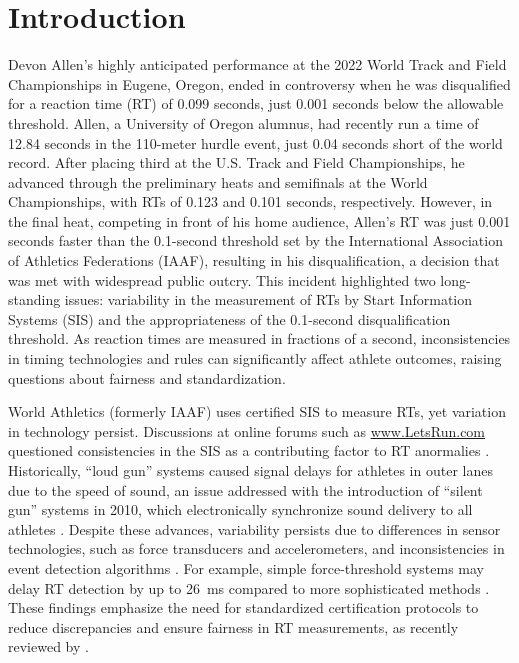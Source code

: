 \documentclass[12pt, letterpaper]{article}
\begin{document}
\doublespace


\section{Introduction}
\label{sec:intro}

Devon Allen’s highly anticipated performance at the 2022 World
Track and Field Championships in Eugene, Oregon, ended in
controversy when he was disqualified for a reaction time (RT) of
0.099 seconds, just 0.001 seconds below the allowable threshold.
Allen, a University of Oregon alumnus,
had recently run a time of 12.84 seconds in the 110-meter hurdle
event, just 0.04 seconds short of the world record. After placing
third at the U.S. Track and Field Championships, he advanced
through the preliminary heats and semifinals at the World
Championships, with RTs of 0.123 and 0.101 seconds,
respectively. However, in the final heat, competing in front of his
home audience, Allen’s RT was just 0.001 seconds faster
than the 0.1-second threshold set by the International Association
of Athletics Federations (IAAF), resulting in his disqualification, a
decision that was met with widespread public outcry. This 
incident highlighted two long-standing issues: variability in the
measurement of RTs by Start Information Systems (SIS) and the
appropriateness of the 0.1-second disqualification threshold. As
reaction times are measured in fractions of a second, inconsistencies
in timing technologies and rules can significantly affect athlete
outcomes, raising questions about fairness and standardization.


World Athletics (formerly IAAF) uses certified SIS to measure RTs, yet
variation in technology persist. Discussions at online forums such as
\url{www.LetsRun.com} questioned consistencies in the SIS as a
contributing factor to RT anormalies \citep{johnson2022data,
  johnson2022was}. Historically, ``loud gun'' systems caused signal delays
for athletes in outer lanes  due to the speed of sound, an issue
addressed with the introduction of ``silent gun'' systems in 2010,
which electronically synchronize sound delivery to all athletes
\citep{tonnessen2013reaction}. Despite these advances, variability
persists due to differences in sensor technologies, such as force
transducers and accelerometers, and inconsistencies in event detection
algorithms \citep{willwacher2013novel}. For example, simple
force-threshold systems may delay RT detection by up to 26~ms compared
to more sophisticated methods \citep{pain2007sprint}. These findings
emphasize the need for standardized certification protocols to reduce
discrepancies and ensure fairness in RT measurements, as recently
reviewed by \citet{milloz2021sprint}.
\end{document}
